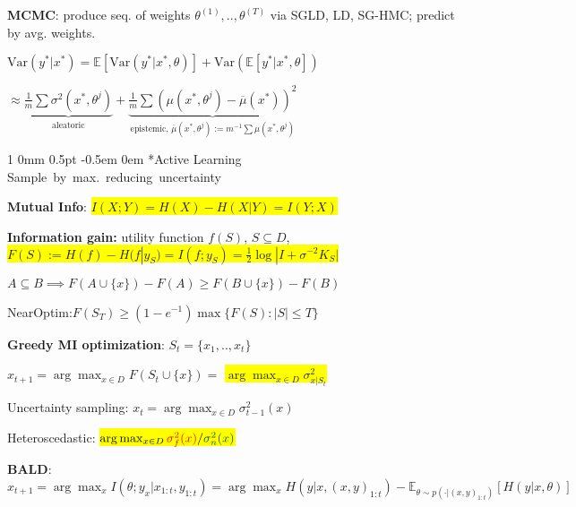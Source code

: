 \documentclass[11pt,landscape,a4paper,fleqn]{article}
\makeatletter
\let\bar\overline
\newcommand*{\rsection}{%
	\@startsection{section}%
	{1}%
	{0mm}%
	{0.5pt}%
	{-0.5em \@plus 0em}
	{\color{myorange}\sffamily\small\bfseries}}
\newcommand{\mhl}[1]{\setlength{\fboxsep}{0pt}\colorbox{yellow}{#1}}
\makeatother
\begin{document}
\begin{multicols*}{4}

\textbf{MCMC}: produce seq. of weights {\fontsize{9}{6}\selectfont $\theta^{(1)},..,\theta^{(T)}$} via SGLD, LD, SG-HMC; predict by avg. weights.

$
\text{Var}(y^*|x^*)=\mathbb{E}[\text{Var}(y^*|x^*,\theta)]+\text{Var}(\mathbb{E}[y^*|x^*,\theta])
$

$
\approx
\underbrace{
\frac{1}{m}\sum\sigma^2(x^*,\theta^j)
}_{
\text{aleatoric}
}
+
\underbrace{\frac{1}{m}\sum(\mu(x^*,\theta^j)-\bar{\mu}(x^*))^2
}_{
\text{epistemic, }  \bar{\mu}(x^*,\theta^j):=m^{-1}\sum \mu(x^*,\theta^j)
}$


\rsection*{Active Learning}
{\fontsize{8}{0}\selectfont \mbox{Sample by max. reducing uncertainty}}

\textbf{Mutual Info}: {\fontsize{9.5}{6}\selectfont \mhl{$I(X;Y) = H(X) - H(X | Y) = I(Y;X)$}}


\textbf{Information gain:} utility function $f(S)$, $S \subseteq D$, \mhl{\fontsize{9}{6}\selectfont $F(S) := H(f) - H(f | y_S) = I(f;y_S) = \frac{1}{2} \log |I + \sigma^{-2} K_S|$}

$A\subseteq B\implies F(A\cup\{x\})-F(A)\geq F(B\cup\{x\})-F(B) $

NearOptim:$F(S_T)\geq (1-e^{-1})\max\{F(S):|S|\leq T\}$

\textbf{Greedy MI optimization}: $S_t = \{x_1,.., x_t\}$

$x_{t+1} = \arg\max_{x \in D} F(S_t \cup \{x\}) = $ \mhl{$\arg\max_{x \in D} \sigma_{x | S_t}^2$}

\iffalse
\vspace*{-1mm}
$\rightarrow$ constant-factor near optimal.
\vspace*{-1mm}
\fi

Uncertainty sampling: $x_t = \arg\max_{x \in D} \sigma_{t-1}^2(x)$

Heteroscedastic: \mhl{$\arg\max_{x \in D} {\textcolor{red}{\sigma_f^2(x)}}/{\textcolor{darkgreen}{\sigma_n^2(x)}}$}


\textbf{BALD}: $x_{t+1} = \arg\max_x I(\theta; y_x | x_{1:t}, y_{1:t}) = \arg\max_x H(y | x, (x,y)_{1:t}) - \mathbb{E}_{\theta \sim p(\cdot | (x,y)_{1:t})}[H(y | x, \theta)]$


\end{multicols*}
\end{document}
